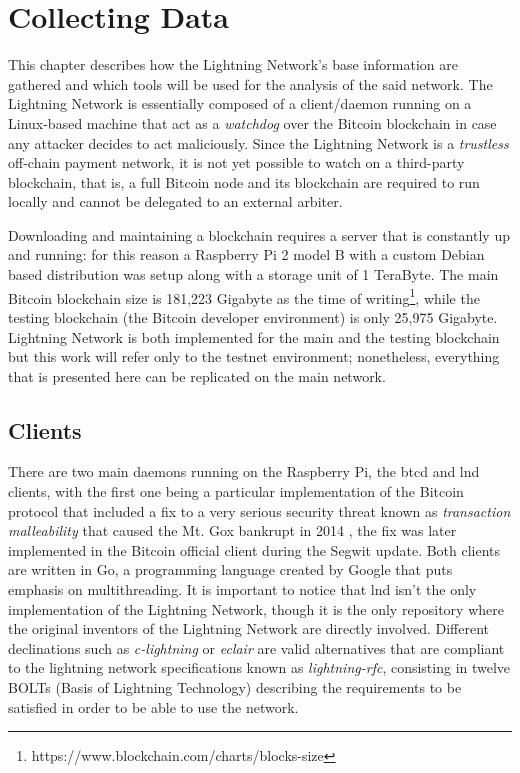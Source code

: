 
	\chapter{Collecting Data}
	This chapter describes how the Lightning Network's base information are gathered and which tools will be used for the analysis of the said network. The Lightning Network is essentially composed of a client/daemon running on a Linux-based machine that act as a \textit{watchdog} over the Bitcoin blockchain in case any attacker decides to act maliciously. Since the Lightning Network is a \textit{trustless} off-chain payment network, it is not yet possible to watch on a third-party blockchain, that is, a full Bitcoin node and its blockchain are required to run locally and cannot be delegated to an external arbiter.
	
	Downloading and maintaining a blockchain requires a server that is constantly up and running: for this reason a Raspberry Pi 2 model B with a custom Debian based distribution was setup along with a storage unit of 1 TeraByte. The main Bitcoin blockchain size is 181,223 Gigabyte as the time of writing\footnote{https://www.blockchain.com/charts/blocks-size}, while the testing blockchain (the Bitcoin developer environment) is only 25,975 Gigabyte. Lightning Network is both implemented for the main and the testing blockchain but this work will refer only to the testnet environment; nonetheless, everything that is presented here can be replicated on the main network.
	
	\section{Clients}
	
	There are two main daemons running on the Raspberry Pi, the btcd and lnd clients, with the first one being a particular implementation of the Bitcoin protocol that included a fix to a very serious security threat known as \textit{transaction malleability} \cite{Andrychowicz2015} that caused the Mt. Gox bankrupt in 2014 \cite{Decker2014}, the fix was later implemented in the Bitcoin official client during the Segwit update. Both clients are written in Go, a programming language created by Google that puts emphasis on multithreading. It is important to notice that lnd isn't the only implementation of the Lightning Network, though it is the only repository where the original inventors of the Lightning Network are directly involved. Different declinations such as \textit{c-lightning} or \textit{eclair} are valid alternatives that are compliant to the lightning network specifications known as \textit{lightning-rfc}, consisting in twelve BOLTs (Basis of Lightning Technology) describing the requirements to be satisfied in order to be able to use the network.
	
